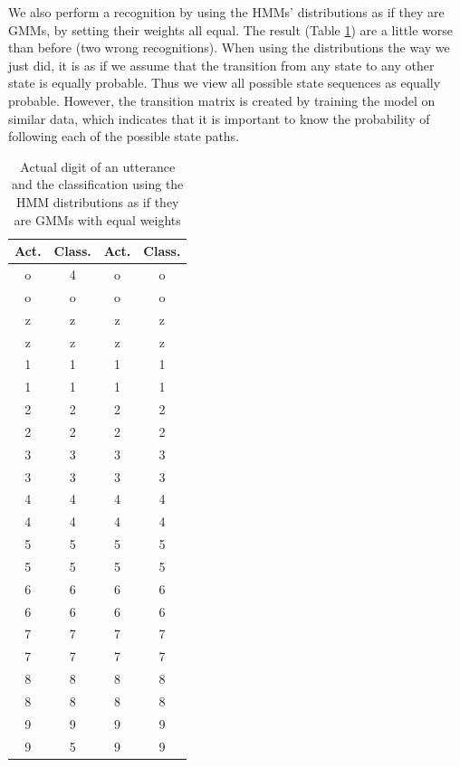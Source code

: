 \documentclass[12pt,a4paper,oneside]{article}
\begin{document}
We also perform a recognition by using the HMMs' distributions as if they are GMMs, by setting their weights all equal. The result (Table \ref{tab:HMM_class1}) are a little worse than before (two wrong recognitions). When using the distributions the way we just did, it is as if we assume that the transition from any state to any other state is equally probable. Thus we view all possible state sequences as equally probable. However, the transition matrix is created by training the model on similar data, which indicates that it is important to know the probability of following each of the possible state paths.

\begin{table}[!ht]
\begin{center}
\footnotesize
\caption{Actual digit of an utterance and the classification using the HMM distributions as if they are GMMs with equal weights} \label{tab:HMM_class1}
    \begin{tabular}{||c|c||c|c||}
    \hline
    Act. & Class. & Act. & Class. \\
    \hline
    o & 4 & o & o \\
    o & o & o & o \\
    z & z & z & z \\
    z & z & z & z \\
    1 & 1 & 1 & 1 \\
    1 & 1 & 1 & 1 \\
    2 & 2 & 2 & 2 \\
    2 & 2 & 2 & 2 \\
    3 & 3 & 3 & 3 \\
    3 & 3 & 3 & 3 \\
    4 & 4 & 4 & 4 \\
    4 & 4 & 4 & 4 \\
    5 & 5 & 5 & 5 \\
    5 & 5 & 5 & 5 \\
    6 & 6 & 6 & 6 \\
    6 & 6 & 6 & 6 \\
    7 & 7 & 7 & 7 \\
    7 & 7 & 7 & 7 \\
    8 & 8 & 8 & 8 \\
    8 & 8 & 8 & 8 \\
    9 & 9 & 9 & 9 \\
    9 & 5 & 9 & 9 \\
    \hline
    \end{tabular}
    \end{center}
\end{table}
\end{document}
